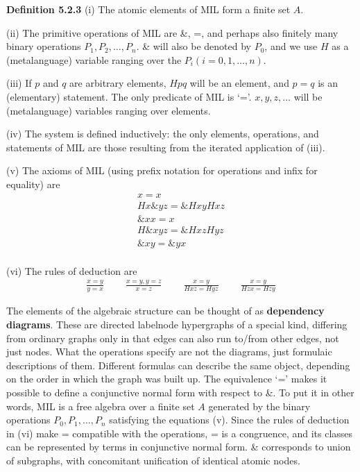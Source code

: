 \bigskip 
\noindent 
{\bf Definition 5.2.3} (i) The atomic elements of MIL form a finite set $A$. 

\smallskip
\noindent  
(ii) The primitive operations of MIL are \&, =, and perhaps also finitely many
binary operations $P_1, P_2, \ldots, P_n$. \& will also be denoted by $P_0$,
and we use $H$ as a (metalanguage) variable ranging over the $P_i
(i=0,1,\ldots,n)$.

\smallskip 
\noindent 
(iii) If $p$ and $q$ are arbitrary elements, $Hpq$ will be an element, and
$p=q$ is an (elementary) statement. The only predicate of MIL is `='.
$x,y,z,\ldots$ will be (metalanguage) variables ranging over elements. 
  
\smallskip
\noindent  
(iv) The system is defined inductively: the only elements, operations, and
statements of MIL are those resulting from the iterated application of (iii). 
  
\smallskip
\noindent  
(v) The axioms of MIL (using prefix notation for operations and infix for 
equality) are
\begin{eqnarray*}
 x = x\\
 Hx\&yz = \&HxyHxz\\
 \&xx = x\\
 H\&xyz = \&HxzHyz\\
 \&xy = \&yx\\
\end{eqnarray*}


\smallskip
\noindent  
(vi) The rules of deduction are
\begin{eqnarray*}
\frac{x=y}{y=x} \; \; \; \; \; \; \; \; \frac{x = y,y = z}{x=z} \; \; \; \; \; \; \; \; \frac{x = y}{Hxz = Hyz} \; \; \; \; \; \; \; \; \frac{x = y}{Hzx = Hzy}
\end{eqnarray*}

\smallskip 
\noindent 
The elements of the algebraic structure can be thought of as {\bf dependency
  diagrams}. These are directed labelnode hypergraphs of a special kind,
differing from ordinary graphs only in that edges can also run to/from other
edges, not just nodes. What the operations specify are not the diagrams, just
formulaic descriptions of them. Different formulas can describe the same
object, depending on the order in which the graph was built up. The
equivalence `=' makes it possible to define a conjunctive normal form with
respect to \&.  To put it in other words, MIL is a free algebra over a finite
set $A$ generated by the binary operations $P_0, P_1, \ldots, P_n$ satisfying
the equations (v).  Since the rules of deduction in (vi) make = compatible
with the operations, = is a congruence, and its classes can be represented by
terms in conjunctive normal form. \& corresponds to union of subgraphs, with
concomitant unification of identical atomic nodes.

